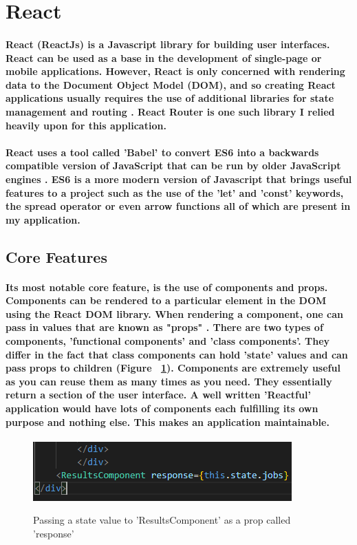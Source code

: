 \section{React}
\paragraph{React (ReactJs) is a Javascript library for building user interfaces. React can be used as a base in the development of single-page or mobile applications. However, React is only concerned with rendering data to the Document Object Model (DOM), and so creating React applications usually requires the use of additional libraries for state management and routing \cite{React:wiki}. React Router is one such library I relied heavily upon for this application.}
\paragraph{React uses a tool called 'Babel' to convert ES6 into a backwards compatible version of JavaScript that can be run by older JavaScript engines \cite{Babel}. ES6 is a more modern version of Javascript that brings useful features to a project such as the use of the 'let' and 'const' keywords, the spread operator or even arrow functions all of which are present in my application.}
\subsection{Core Features}
\paragraph{Its most notable core feature, is the use of components and props. Components can be rendered to a particular element in the DOM using the React DOM library. When rendering a component, one can pass in values that are known as "props" \cite{React:components}. There are two types of components, 'functional components' and 'class components'. They differ in the fact that class components can hold 'state' values and can pass props to children (Figure ~\ref{react1_label}). Components are extremely useful as you can reuse them as many times as you need. They essentially return a section of the user interface. A well written 'Reactful' application would have lots of components each fulfilling its own purpose and nothing else. This makes an application maintainable.}
\begin{figure}[h]
    \centering
    \includegraphics[scale=0.8]{Images/react1.png} 
    \label{react1_label}
    \caption{Passing a state value to 'ResultsComponent' as a prop called 'response'}
\end{figure}
